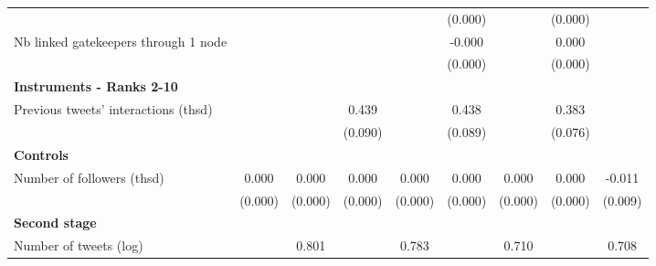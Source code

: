 {\begin{tabular}{l*{8}{c}}
                    &                     &                     &                     &                     &     (0.000)         &                     &     (0.000)         &                     \\
Nb linked gatekeepers through 1 node&                     &                     &                     &                     &      -0.000         &                     &       0.000         &                     \\
                    &                     &                     &                     &                     &     (0.000)         &                     &     (0.000)         &                     \\
\textbf{Instruments - Ranks 2-10}&                     &                     &                     &                     &                     &                     &                     &                     \\
Previous tweets' interactions (thsd)&                     &                     &       0.439\sym{***}&                     &       0.438\sym{***}&                     &       0.383\sym{***}&                     \\
                    &                     &                     &     (0.090)         &                     &     (0.089)         &                     &     (0.076)         &                     \\
\textbf{Controls}   &                     &                     &                     &                     &                     &                     &                     &                     \\
Number of followers (thsd)&       0.000\sym{*}  &       0.000         &       0.000\sym{*}  &       0.000         &       0.000\sym{*}  &       0.000         &       0.000         &      -0.011         \\
                    &     (0.000)         &     (0.000)         &     (0.000)         &     (0.000)         &     (0.000)         &     (0.000)         &     (0.000)         &     (0.009)         \\
\textbf{Second stage}&                     &                     &                     &                     &                     &                     &                     &                     \\
Number of tweets (log)&                     &       0.801\sym{***}&                     &       0.783\sym{***}&                     &       0.710\sym{***}&                     &       0.708\sym{***}\\

\end{tabular}}
